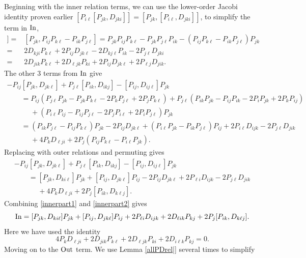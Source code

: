 \documentclass[pdftex]{sigma}
\numberwithin{equation}{section}
\begin{document}
Beginning with the inner relation terms, we can use the lower-order Jacobi identity proven earlier
$ [P_{i \ell}[P_{jk}, D_{jki}]] =[P_{jk}, [P_{i\ell}, D_{jki}]]$,
to simplify the term in ${\rm In}$,
 \begin{align}
  [P_{i \ell}[P_{jk}, D_{jki}]] ={}& [P_{jk}, P_{ij}P_{k\ell}-P_{ik}P_{j\ell}]
   = P_{jk}P_{ij}P_{k\ell}- P_{jk}P_{j\ell}P_{ik} -(P_{ij}P_{k\ell}-P_{ik}P_{j\ell})P_{jk} \nonumber \\
   ={}&2D_{kji}P_{k\ell}+2P_{ij}D_{jk\ell}- 2D_{kj\ell}P_{ik}-2P_{j\ell}D_{jki}
   \nonumber \\
   ={}& 2D_{jik}P_{k\ell} +2 D_{\ell jk}P_{ki} +2P_{ij}D_{jk\ell}+2P_{\ell j}D_{jik}.\label{innerpart1}
 \end{align}
 The other 3 terms from ${\rm In}$ give
 \begin{gather*}
   - P_{ij}[P_{jk}, D_{jk\ell}] + P_{j\ell} [P_{ik}, D_{ikj}]-[P_{ij}, D_{ij\ell}] P_{jk}\\
  \qquad  = P_{ij}( P_{j\ell}P_{jk}-P_{jk}P_{k\ell} - 2P_kP_{j\ell} +2P_j P_{k\ell}) +P_{j\ell}( P_{ik}P_{jk}-P_{ij}P_{ik}-2P_iP_{jk}+2P_kP_{ij})
\\
 \phantom{\qquad  =}{} + (P_{i\ell}P_{ij}-P_{ij}P_{j\ell} -2P_jP_{i\ell}+2P_iP_{j\ell})P_{jk}\\
   \qquad = (P_{ik}P_{j\ell} -P_{ij}P_{k\ell})P_{jk}-2P_{ij}D_{jk\ell}
     +(P_{i\ell}P_{jk}- P_{ik}P_{j\ell})P_{ij} +2P_{i\ell}D_{ijk}- 2P_{j\ell}D_{jik}\\
    \phantom{\qquad  =}{}   +4P_{k}D_{\ell j i}+2P_j(P_{ij}P_{k\ell} - P_{i\ell}P_{jk}).
 \end{gather*}
 Replacing with outer relations and permuting gives
 \begin{gather}
   - P_{ij}[P_{jk}, D_{jk\ell}]+P_{j\ell} [P_{ik}, D_{ikj}]-[P_{ij}, D_{ij\ell}] P_{jk} \nonumber \\
   \qquad=[P_{jk}, D_{ki\ell}]P_{jk}+[P_{ij}, D_{jk\ell}]P_{ij}
    -2P_{ij}D_{jk\ell} +2P_{\ell i }D_{ijk}- 2P_{j\ell}D_{jik}\nonumber\\
  \phantom{\qquad  =}{} +4P_{k}D_{\ell j i}+2P_j[P_{ik}, D_{k\ell j}].\label{innerpart2}
   \end{gather}
   Combining \eqref{innerpart1} and \eqref{innerpart2} gives
   \[
    {\rm In} = [P_{jk}, D_{ki\ell}]P_{jk}+[P_{ij}, D_{jk\ell}]P_{ij}+2P_{\ell i }D_{ijk}+2D_{\ell i k}P_{kj}+2P_j[P_{ik}, D_{k\ell j}].
    \]
   Here we have used the identity
   \[ 4P_{k}D_{\ell j i} + 2D_{jik}P_{k\ell} +2 D_{\ell jk}P_{ki}+2D_{i\ell k}P_{kj}=0.\]
Moving on to the ${\rm Out}$ term. We use Lemma \ref{allPDrel|} several times to simplify
\end{document}
